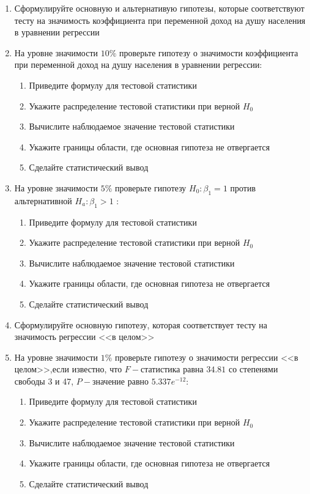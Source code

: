 \documentclass[pdftex,11pt,openany]{book}\usepackage[]{graphicx}\usepackage[]{color}
\begin{document}
\begin{problem}
\begin{enumerate}
\item Сформулируйте основную и альтернативую гипотезы, которые соответствуют тесту на значимость коэффициента при переменной доход на душу населения в уравнении регрессии
\item На уровне значимости $10\%$ проверьте гипотезу о значимости коэффициента при переменной доход на душу населения в уравнении регрессии:
\begin{enumerate}
\item Приведите формулу для тестовой статистики
\item Укажите распределение тестовой статистики при верной $H_0$
\item Вычислите наблюдаемое значение тестовой статистики
\item Укажите границы области, где основная гипотеза не отвергается
\item Сделайте статистический вывод
\end{enumerate}
\item На уровне значимости $5\%$ проверьте гипотезу $H_0: \beta_1 = 1$ против альтернативной $H_a: \beta_1 > 1$ :
\begin{enumerate}
\item Приведите формулу для тестовой статистики
\item Укажите распределение тестовой статистики при верной $H_0$
\item Вычислите наблюдаемое значение тестовой статистики
\item Укажите границы области, где основная гипотеза не отвергается
\item Сделайте статистический вывод
\end{enumerate}
\item Сформулируйте основную гипотезу, которая соответствует тесту на значимость регрессии <<в целом>>
\item На уровне значимости $1\%$ проверьте гипотезу о значимости регрессии <<в целом>>,если известно, что $F-$статистика равна $34.81$ со степенями свободы 3 и 47, $P-$значение равно $5.337e^{-12}$:
\begin{enumerate}
\item Приведите формулу для тестовой статистики
\item Укажите распределение тестовой статистики  при верной $H_0$
\item Вычислите наблюдаемое значение тестовой статистики
\item Укажите границы области, где основная гипотеза не отвергается
\item Сделайте статистический вывод
\end{enumerate}


\end{enumerate}
\end{problem}
\end{document}
